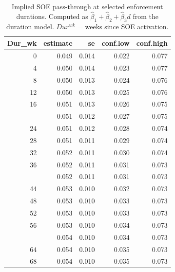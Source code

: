 \begin{table}[!h]
\centering
\caption{\label{tab:tab:passthrough_implied_soe}Implied SOE pass-through at selected enforcement durations. Computed as $\hat{\beta}_1 + \hat{\beta}_2 + \hat{\beta}_3 d$ from the duration model. $Dur^{wk}$ = weeks since SOE activation.}
\centering
\begin{tabular}[t]{rrrrr}
\toprule
Dur\_wk & estimate & se & conf.low & conf.high\\
\midrule
0 & 0.049 & 0.014 & 0.022 & 0.077\\
4 & 0.050 & 0.014 & 0.023 & 0.077\\
8 & 0.050 & 0.013 & 0.024 & 0.076\\
12 & 0.050 & 0.013 & 0.025 & 0.076\\
16 & 0.051 & 0.013 & 0.026 & 0.075\\
\addlinespace
20 & 0.051 & 0.012 & 0.027 & 0.075\\
24 & 0.051 & 0.012 & 0.028 & 0.074\\
28 & 0.051 & 0.011 & 0.029 & 0.074\\
32 & 0.052 & 0.011 & 0.030 & 0.074\\
36 & 0.052 & 0.011 & 0.031 & 0.073\\
\addlinespace
40 & 0.052 & 0.011 & 0.031 & 0.073\\
44 & 0.053 & 0.010 & 0.032 & 0.073\\
48 & 0.053 & 0.010 & 0.033 & 0.073\\
52 & 0.053 & 0.010 & 0.033 & 0.073\\
56 & 0.053 & 0.010 & 0.034 & 0.073\\
\addlinespace
60 & 0.054 & 0.010 & 0.034 & 0.073\\
64 & 0.054 & 0.010 & 0.035 & 0.073\\
68 & 0.054 & 0.010 & 0.035 & 0.073\\
\bottomrule
\end{tabular}
\end{table}
